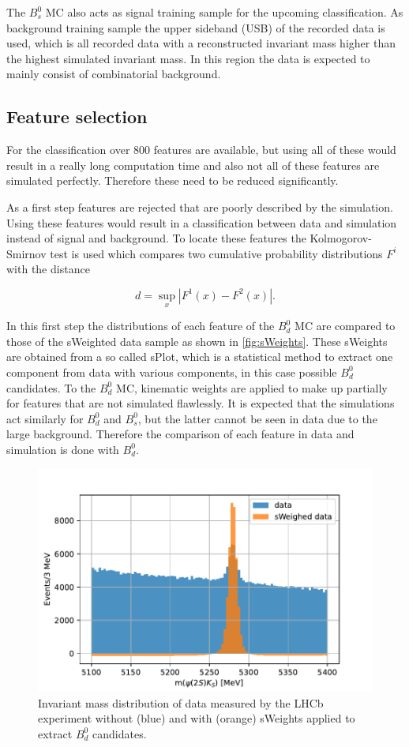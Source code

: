 The $B^0_s$ MC also acts as signal training sample for the upcoming classification. As background training sample the upper sideband (USB) of the recorded data is used, which is all recorded data with a reconstructed invariant mass higher than the highest simulated invariant mass. In this region the data is expected to mainly consist of combinatorial background.

\subsection{Feature selection}
For the classification over $\num{800}$ features are available, but using all of these would result in a really long computation time and also not all of these features are simulated perfectly. Therefore these need to be reduced significantly.

As a first step features are rejected that are poorly described by the simulation. Using these features would result in a classification between data and simulation instead of signal and background. To locate these features the Kolmogorov-Smirnov test is used which compares two cumulative probability distributions $F^i$ with the distance

\begin{equation*}
  d = \sup_x \left|F^1(x) - F^2(x)\right|.
\end{equation*}

In this first step the distributions of each feature of the $B^0_d$ MC are compared to those of the sWeighted data sample as shown in \autoref{fig:sWeights}. These sWeights are obtained from a so called sPlot, which is a statistical method to extract one component from data with various components, in this case possible $B^0_d$ candidates. To the $B^0_d$ MC, kinematic weights are applied to make up partially for features that are not simulated flawlessly. It is expected that the simulations act similarly for $B^0_d$ and $B^0_s$, but the latter cannot be seen in data due to the large background. Therefore the comparison of each feature in data and simulation is done with $B^0_d$.

\begin{figure}[tb]
  \centering
  \includegraphics[width=12cm]{../plots/sweights.pdf}
  \caption{Invariant mass distribution of data measured by the LHCb experiment without (blue) and with (orange) sWeights applied to extract $B^0_d$ candidates.}
  \label{fig:sWeights}
\end{figure}

